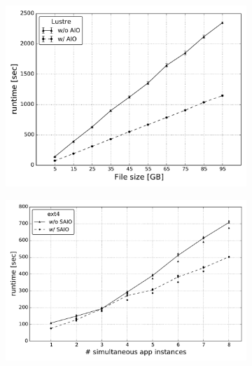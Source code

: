 \begin{figure}[!htb]
\begin{subfigure}[t]{0.32\textwidth}
    \centering
    \includegraphics[width=\textwidth]{figures/SC2015/ROOT/separate_plots/test_cluster/Lustre/runtime}
    \caption{\textit{}}
    \label{figure: lustre_1}
  \end{subfigure}
  \begin{subfigure}[b]{0.32\textwidth}
    \centering
    \includegraphics[width=\textwidth]{figures/SC2015/ROOT/cluster/multiple_instances/simult_instance_ext4_test_cluster}
    \caption{\textit{}}
    \label{figure: ext4_2}
  \end{subfigure}
  \begin{subfigure}[b]{0.32\textwidth}
    \centering

\end{subfigure}
\end{figure}
